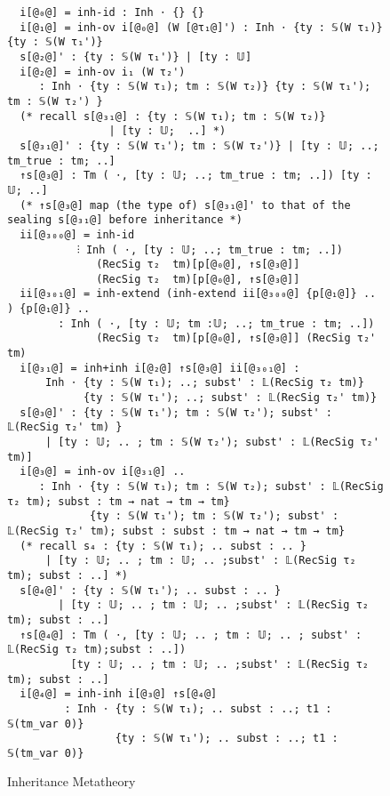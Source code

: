 \begin{figure}[!htb]
\begin{minipage}{\textwidth}
\begin{multicols}{3}
\begin{lstlisting}
  i[@₀@] = inh-id : Inh ⋅ {} {} 
  i[@₁@] = inh-ov i[@₀@] (W [@τ₁@]') : Inh ⋅ {ty : 𝕊(W τ₁)} {ty : 𝕊(W τ₁')}
  s[@₂@]' : {ty : 𝕊(W τ₁')} | [ty : 𝕌] 
  i[@₂@] = inh-ov i₁ (W τ₂') 
     : Inh ⋅ {ty : 𝕊(W τ₁); tm : 𝕊(W τ₂)} {ty : 𝕊(W τ₁'); tm : 𝕊(W τ₂') }
  (* recall s[@₃₁@] : {ty : 𝕊(W τ₁); tm : 𝕊(W τ₂)} 
                | [ty : 𝕌;  ..] *)
  s[@₃₁@]' : {ty : 𝕊(W τ₁'); tm : 𝕊(W τ₂')} | [ty : 𝕌; ..; tm_true : tm; ..]
  ↑s[@₃@] : Tm ( ⋅, [ty : 𝕌; ..; tm_true : tm; ..]) [ty : 𝕌; ..] 
  (* ↑s[@₃@] map (the type of) s[@₃₁@]' to that of the sealing s[@₃₁@] before inheritance *)
  ii[@₃₀₀@] = inh-id 
           ⫶ Inh ( ⋅, [ty : 𝕌; ..; tm_true : tm; ..])
              (RecSig τ₂  tm)[p[@₀@], ↑s[@₃@]]
              (RecSig τ₂  tm)[p[@₀@], ↑s[@₃@]]
  ii[@₃₀₁@] = inh-extend (inh-extend ii[@₃₀₀@] {p[@₁@]} .. ) {p[@₁@]} ..
        : Inh ( ⋅, [ty : 𝕌; tm :𝕌; ..; tm_true : tm; ..]) 
              (RecSig τ₂  tm)[p[@₀@], ↑s[@₃@]] (RecSig τ₂'  tm)
  i[@₃₁@] = inh+inh i[@₂@] ↑s[@₃@] ii[@₃₀₁@] : 
      Inh ⋅ {ty : 𝕊(W τ₁); ..; subst' : 𝕃(RecSig τ₂ tm)} 
            {ty : 𝕊(W τ₁'); ..; subst' : 𝕃(RecSig τ₂' tm)}
  s[@₃@]' : {ty : 𝕊(W τ₁'); tm : 𝕊(W τ₂'); subst' : 𝕃(RecSig τ₂' tm) }
      | [ty : 𝕌; .. ; tm : 𝕊(W τ₂'); subst' : 𝕃(RecSig τ₂' tm)] 
  i[@₃@] = inh-ov i[@₃₁@] ..
     : Inh ⋅ {ty : 𝕊(W τ₁); tm : 𝕊(W τ₂); subst' : 𝕃(RecSig τ₂ tm); subst : tm → nat → tm → tm}  
             {ty : 𝕊(W τ₁'); tm : 𝕊(W τ₂'); subst' : 𝕃(RecSig τ₂' tm); subst : subst : tm → nat → tm → tm}
  (* recall s₄ : {ty : 𝕊(W τ₁); .. subst : .. } 
      | [ty : 𝕌; .. ; tm : 𝕌; .. ;subst' : 𝕃(RecSig τ₂ tm); subst : ..] *)
  s[@₄@]' : {ty : 𝕊(W τ₁'); .. subst : .. } 
        | [ty : 𝕌; .. ; tm : 𝕌; .. ;subst' : 𝕃(RecSig τ₂ tm); subst : ..]
  ↑s[@₄@] : Tm ( ⋅, [ty : 𝕌; .. ; tm : 𝕌; .. ; subst' : 𝕃(RecSig τ₂ tm);subst : ..]) 
          [ty : 𝕌; .. ; tm : 𝕌; .. ;subst' : 𝕃(RecSig τ₂ tm); subst : ..]
  i[@₄@] = inh-inh i[@₃@] ↑s[@₄@] 
         : Inh ⋅ {ty : 𝕊(W τ₁); .. subst : ..; t1 : 𝕊(tm_var 0)} 
                 {ty : 𝕊(W τ₁'); .. subst : ..; t1 : 𝕊(tm_var 0)} 
  \end{lstlisting}
  
  \columnbreak
  

  
  \end{multicols}
  \end{minipage}
  \caption{Inheritance Metatheory}\label{fig:inheritance}
  \end{figure}

\fi

